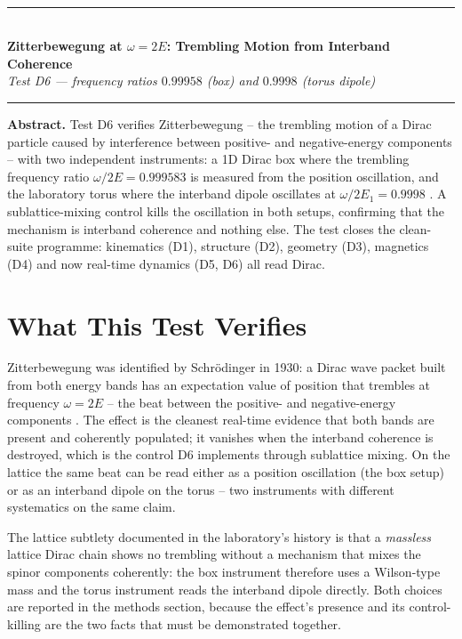\documentclass[11pt,a4paper]{article}
\begin{document}
\\[0.3em]
\rule{\textwidth}{0.8pt}\\[0.6em]
{\LARGE\bfseries\color{labblue} Zitterbewegung at $\omega = 2E$: Trembling Motion from Interband Coherence}\\[0.5em]
{\normalsize\itshape Test D6 — frequency ratios $0.99958$ (box) and $0.9998$ (torus dipole)}\\[0.4em]
\rule{\textwidth}{0.4pt}

\begin{tcolorbox}[colback=labgreen!8, colframe=labgreen!70!black, title={Verdict: PASS — 2/2 checks}, fonttitle=\bfseries, boxrule=0.6pt]
\textbf{Abstract.} Test D6 verifies Zitterbewegung -- the trembling motion of a Dirac particle caused by interference between positive- and negative-energy components -- with two independent instruments: a 1D Dirac box where the trembling frequency ratio $\omega/2E = 0.999583$ is measured from the position oscillation, and the laboratory torus where the interband dipole oscillates at $\omega/2E_1 = 0.9998$ \cite{schrodinger,dirac}. A sublattice-mixing control kills the oscillation in both setups, confirming that the mechanism is interband coherence and nothing else. The test closes the clean-suite programme: kinematics (D1), structure (D2), geometry (D3), magnetics (D4) and now real-time dynamics (D5, D6) all read Dirac.
\end{tcolorbox}

\section{What This Test Verifies}
Zitterbewegung was identified by Schrödinger in 1930: a Dirac wave packet built from both energy bands has an expectation value of position that trembles at frequency $\omega = 2E$ -- the beat between the positive- and negative-energy components \cite{schrodinger}. The effect is the cleanest real-time evidence that both bands are present and coherently populated; it vanishes when the interband coherence is destroyed, which is the control D6 implements through sublattice mixing. On the lattice the same beat can be read either as a position oscillation (the box setup) or as an interband dipole on the torus -- two instruments with different systematics on the same claim.

The lattice subtlety documented in the laboratory's history is that a \emph{massless} lattice Dirac chain shows no trembling without a mechanism that mixes the spinor components coherently: the box instrument therefore uses a Wilson-type mass and the torus instrument reads the interband dipole directly. Both choices are reported in the methods section, because the effect's presence and its control-killing are the two facts that must be demonstrated together.
\end{document}
